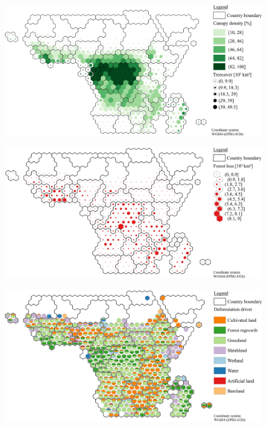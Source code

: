 	    \begin{figure}[ht]
		    \centering
		    \includegraphics[scale=1]{img/africa_treecover_frameless}
		    \caption[Ecosystem service values]{}
		    \label{fig:africacover}
	    \end{figure}
	    \begin{figure}[ht]
		    \centering
		    \includegraphics[scale=1]{img/africa_loss_frameless}
		    \caption[Ecosystem service values]{}
		    \label{fig:africaloss}
	    \end{figure}
	    \begin{figure}[ht]
		    \centering
		    \includegraphics[scale=1]{img/africa_driver_frameless}
		    \caption[Ecosystem service values]{}
		    \label{fig:africadriver}
	    \end{figure}

